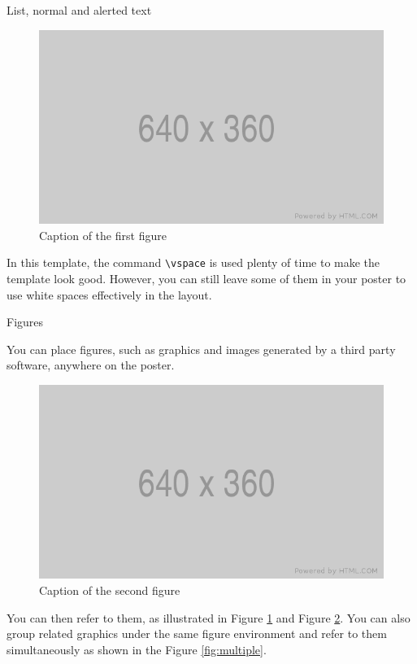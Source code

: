 \documentclass{beamer}
\newlength{\onecolwid}
\begin{document}
\begin{frame}[t, fragile]
\begin{columns}[t]
\begin{column}{\onecolwid}
\begin{block}{List, normal and alerted text}
	\vspace{0.5in}
	
	\begin{figure}
		\includegraphics[width=0.8\linewidth]{placeholder.png}
		\caption{Caption of the first figure}
		\label{fig:1}
	\end{figure}
	
	In this template, the command \texttt{\textbackslash vspace} is used plenty of time to make the template look good. However, you can still leave some of them in your poster to use white spaces effectively in the layout.
	
\end{block}


\begin{block}{Figures}
	
	You can place figures, such as graphics and images generated by a third party software, anywhere on the poster.
	\vspace{0.5in}
	\begin{figure}
		\includegraphics[width=0.8\linewidth]{placeholder.png}
		\caption{Caption of the second figure}
		\label{fig:2}
	\end{figure}
	You can then refer to them, as illustrated in Figure \ref{fig:1} and Figure \ref{fig:2}. You can also group related graphics under the same figure environment and refer to them simultaneously as shown in the Figure \ref{fig:multiple}.
	

\end{block}
\end{column}
\end{columns}
\end{frame}
\end{document}
